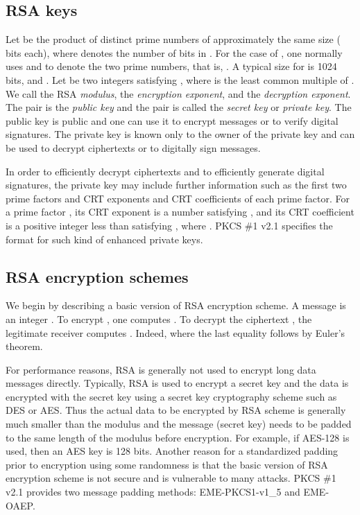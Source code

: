 \documentclass{article}
\begin{document}
\subsection{RSA keys}
Let  be the product 
of  distinct prime numbers of approximately 
the same size ( bits each), where  denotes the number of 
bits in . For the case of , 
one normally uses  and  to denote the two prime numbers,
that is, . A typical size for  is 
1024 bits, and . Let  be two integers satisfying 
, where  is the least
common multiple of . 
We call  the RSA {\em modulus},  the {\em encryption exponent},
and  the {\em decryption exponent}. The pair  is the 
{\em public key} and the pair  is called the {\em secret key}
or {\em private key}. The public key is public and one can use it
to encrypt messages or to verify digital signatures. The private key 
is known only to the owner of the private key and can be
used to decrypt ciphertexts or to digitally sign messages.

In order to efficiently decrypt ciphertexts and to efficiently generate
digital signatures, the private key may include further information 
such as the first two prime factors and  CRT exponents and CRT 
coefficients of each prime factor. For a prime factor , its CRT exponent
is a number  satisfying ,
and its  CRT coefficient  is a positive integer 
less than  satisfying ,
where .
PKCS \#1 v2.1 specifies the format
for such kind of enhanced private keys.

\subsection{RSA encryption schemes}
We begin by describing a basic version of 
RSA encryption scheme. A message is an integer . To encrypt , 
one computes .
To decrypt the ciphertext , the legitimate receiver computes
. Indeed, 
 where
the last equality follows by Euler's theorem.

For performance reasons, RSA is generally not used to encrypt 
long data messages directly. Typically, 
RSA is used to encrypt a secret key and the data is encrypted with 
the secret key using a secret key cryptography scheme such as DES or AES.
Thus the actual data to be encrypted by RSA scheme is generally much 
smaller than the modulus and the message (secret key) needs to be 
padded to the same length of the modulus before encryption. 
For example, if AES-128 is used, then an AES key is 128 bits.
Another reason for a standardized padding
prior to encryption using some randomness is that the 
basic version of RSA encryption scheme is not secure and is 
vulnerable to many attacks. PKCS \#1 v2.1 provides two message padding 
methods: EME-PKCS1-v1\_5 and EME-OAEP. 
\end{document}
